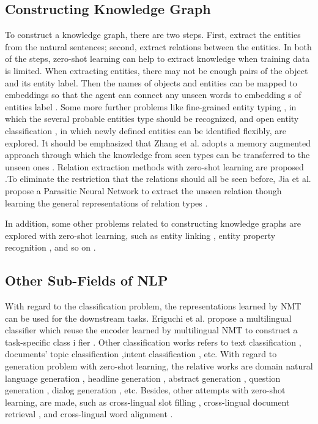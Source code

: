 \documentclass[sigconf, review]{acmart}
\begin{document}
\subsection{Constructing Knowledge Graph}
To construct a knowledge graph, there are two steps. First, extract the entities from the natural sentences; second, extract relations between the entities. In both of the steps, zero-shot learning can help to extract knowledge when training data is limited. When extracting entities, there may not be enough pairs of the object and its entity label. Then the names of objects and entities can be mapped to embeddings so that the agent can connect any unseen words to embedding s of entities label \cite{pasupat2014zero,guerini2018toward}. Some more further problems like fine-grained entity typing \cite{ma2016label,obeidat2019description}, in which the several probable entities type should be recognized, and open entity classification \cite{zhou2019zero, zhang2020mzet}, in which newly defined entities can be identified flexibly, are explored. It should be emphasized that Zhang et al. adopts a memory augmented approach through which the knowledge from seen types can be transferred to the unseen ones \cite{zhang2020mzet}. Relation extraction methods with zero-shot learning are proposed \cite{levy2017zero}.To eliminate the restriction that the relations should all be seen before, Jia et al. propose a Parasitic Neural Network to extract the unseen relation though learning the general representations of relation types \cite{jia2020parasitic}.

In addition, some other problems related to constructing knowledge graphs are explored with zero-shot learning, such as entity linking \cite{rijhwani2019zero}, entity property recognition \cite{imrattanatrai2019identifying}, and so on \cite{rei2018zero,al2016recovering}.

\subsection{Other Sub-Fields of NLP}

With regard to the classification problem, the representations learned by NMT can be used for the downstream tasks. Eriguchi et al. propose a multilingual classifier which reuse the encoder learned by multilingual NMT to construct a task-specific class i fier \cite{eriguchi2018zero}. Other classification works refers to text classification \cite{dauphin2013zero,zhang2019integrating,dai2018multilingual}, documents’ topic classification \cite{song2019toward},intent classification \cite{xia2018zero,williams2019zero,chen2018zero}, etc. With regard to generation problem with zero-shot learning, the relative works are domain natural language generation \cite{dethlefs2017domain}, headline generation \cite{shen2018zero}, abstract generation \cite{duan2019zero}, question generation \cite{elsahar2018zero}, dialog generation \cite{zhao2018zero}, etc. Besides, other attempts with zero-shot learning, are made, such as cross-lingual slot filling \cite{shah2019robust}, cross-lingual document retrieval \cite{funaki2015image}, and cross-lingual word alignment \cite{schuster2019cross}.
\end{document}
